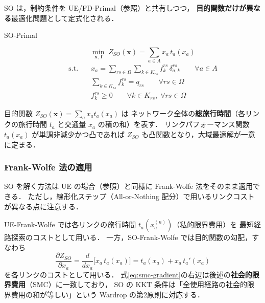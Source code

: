 SO は，制約条件を UE/FD-Primal（参照）と共有しつつ，
\textbf{目的関数だけが異なる}最適化問題として定式化される\cite{Beckmann1956}．

\begin{description}
  \item[SO-Primal]
    \begin{equation}
      \min_{\boldsymbol{x},\,\boldsymbol{f}}\;
      Z_{SO}(\boldsymbol{x})
      = \sum_{a \in A} x_a\, t_a(x_a)
      \label{eq:so-primal}
    \end{equation}
    \begin{align*}
      \text{s.t.} \quad
      & x_a = \sum_{rs \in \Omega}\sum_{k \in K_{rs}} f_k^{rs}\,\delta_{a,k}^{rs}
        \qquad \forall a \in A \\
      & \sum_{k \in K_{rs}} f_k^{rs} = q_{rs}
        \qquad \forall rs \in \Omega \\
      & f_k^{rs} \geq 0
        \qquad \forall k \in K_{rs},\; \forall rs \in \Omega
    \end{align*}
\end{description}

目的関数 $Z_{SO}(\boldsymbol{x}) = \sum_{a} x_a t_a(x_a)$ は
ネットワーク全体の\textbf{総旅行時間}（各リンクの旅行時間 $t_a$ と交通量 $x_a$ の積の和）を表す．
リンクパフォーマンス関数 $t_a(x_a)$ が単調非減少かつ凸であれば
$Z_{SO}$ も凸関数となり，大域最適解が一意に定まる．

\subsubsection*{Frank-Wolfe 法の適用}

SO を解く方法は UE の場合（参照）と同様に
Frank-Wolfe 法をそのまま適用できる\cite{FrankWolfe1956}．
ただし，線形化ステップ（All-or-Nothing 配分）で用いるリンクコストが異なる点に注意する．

UE-Frank-Wolfe では各リンクの旅行時間 $t_a(x_a^{(n)})$（私的限界費用）を
最短経路探索のコストとして用いる\cite{土木学会1998}．
一方，SO-Frank-Wolfe では目的関数の勾配，すなわち
\begin{equation}
  \frac{\partial Z_{SO}}{\partial x_a}
  = \frac{d}{dx_a}\bigl[x_a\, t_a(x_a)\bigr]
  = t_a(x_a) + x_a\, t_a'(x_a)
  \label{eq:smc-gradient}
\end{equation}
を各リンクのコストとして用いる．
式\eqref{eq:smc-gradient}の右辺は後述の\textbf{社会的限界費用}（SMC）に一致しており，
SO の KKT 条件は「全使用経路の社会的限界費用の和が等しい」という
Wardrop の第2原則に対応する．

